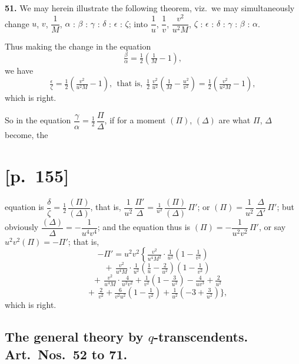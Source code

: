 \documentclass[11pt]{article}
\begin{document}
\medskip
\noindent\textbf{51.} We may herein illustrate the following theorem, viz.\ we may simultaneously
change $u$, $v$, $\dfrac{1}{M}$, $\alpha$ : $\beta$ : $\gamma$ : $\delta$ : $\epsilon$ : $\zeta$; into $\dfrac{1}{u}$, $\dfrac{1}{v}$, $\dfrac{v^2}{u^2M}$, $\zeta$ : $\epsilon$ : $\delta$ : $\gamma$ : $\beta$ : $\alpha$.

Thus making the change in the equation
\[
\tfrac{\beta}{\alpha}=\tfrac{1}{2}\!\left(\tfrac{1}{M}-1\right)\!,
\]
we have
\[
\tfrac{\epsilon}{\zeta}=\tfrac{1}{2}\!\left(\tfrac{v^2}{u^2M}-1\right)\!,\ \ \text{that is,}\ \ \tfrac{1}{2}\,\tfrac{v^2}{u^2}\!\left(\tfrac{1}{M}-\tfrac{u^2}{v^2}\right)\!=\tfrac{1}{2}\!\left(\tfrac{v^2}{u^2M}-1\right)\!,
\]
which is right.

So in the equation $\dfrac{\gamma}{\alpha}=\tfrac{1}{2}\,\dfrac{\Pi}{\Delta}$, if for a moment $(\Pi)$, $(\Delta)$ are what $\Pi$, $\Delta$ become, the

\section*{[p.~155]}
equation is $\dfrac{\delta}{\zeta}=\tfrac{1}{2}\,\dfrac{(\Pi)}{(\Delta)}$, that is, $\dfrac{1}{u^2}\,\dfrac{\Pi'}{\Delta}=\tfrac{1}{u^2}\,\dfrac{(\Pi)}{(\Delta)}\,\Pi'$; or $(\Pi)=\dfrac{1}{u^2}\,\dfrac{\Delta}{\Delta'}\,\Pi'$; but obviously $\dfrac{(\Delta)}{\Delta}=-\dfrac{1}{u^4v^4}$;
and the equation thus is $(\Pi)=-\dfrac{1}{u^2v^2}\,\Pi'$, or say $u^2v^2(\Pi)=-\Pi'$; that is,
\[
-\Pi'=u^2v^2\!\left\{\tfrac{v^2}{u^4M^2}\!\cdot\!\tfrac{1}{u^2}\!\left(1-\tfrac{1}{v^2}\right)\right.
\]
\[
\quad+\,\tfrac{v^2}{u^4M}\!\cdot\!\tfrac{1}{u^2}\!\left(\tfrac{1}{u}-\tfrac{2}{u^2}\right)\!\!\left(1-\tfrac{1}{v^2}\right)
\]
\[
\quad+\,\tfrac{v^2}{u^4M}\!\cdot\!\tfrac{4}{u^2v^2}+\tfrac{1}{v^2}\!\left(1-\tfrac{3}{u^2}\right)\!-\tfrac{4}{uv^3}+\tfrac{2}{u^2}
\]
\[
\quad+\,\tfrac{2}{v^2}+\tfrac{6}{v^2u^2}\!\left(1-\tfrac{1}{v^2}\right)\!+\tfrac{1}{u^2}\!\left(-3+\tfrac{3}{u^2}\right)\!\Big\},
\]
which is right.

\subsection*{The general theory by $q$-transcendents. Art.\ Nos.\ 52 to 71.}
\end{document}
